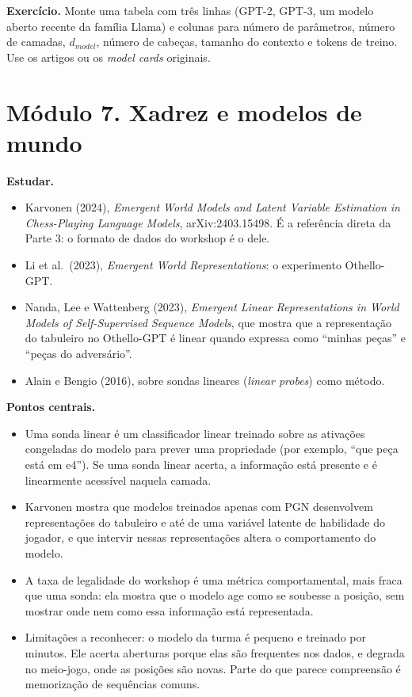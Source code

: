 \documentclass[
  11pt,
]{article}
\providecommand{\tightlist}{%
  \setlength{\itemsep}{0pt}\setlength{\parskip}{0pt}}
\begin{document}
\textbf{Exercício.} Monte uma tabela com três linhas (GPT-2, GPT-3, um
modelo aberto recente da família Llama) e colunas para número de
parâmetros, número de camadas, \(d_{model}\), número de cabeças, tamanho
do contexto e tokens de treino. Use os artigos ou os \emph{model cards}
originais.

\section{Módulo 7. Xadrez e modelos de
mundo}\label{muxf3dulo-7.-xadrez-e-modelos-de-mundo}

\textbf{Estudar.}

\begin{itemize}
\tightlist
\item
  Karvonen (2024), \emph{Emergent World Models and Latent Variable
  Estimation in Chess-Playing Language Models}, arXiv:2403.15498. É a
  referência direta da Parte 3: o formato de dados do workshop é o dele.
\item
  Li et al.~(2023), \emph{Emergent World Representations}: o experimento
  Othello-GPT.
\item
  Nanda, Lee e Wattenberg (2023), \emph{Emergent Linear Representations
  in World Models of Self-Supervised Sequence Models}, que mostra que a
  representação do tabuleiro no Othello-GPT é linear quando expressa
  como ``minhas peças'' e ``peças do adversário''.
\item
  Alain e Bengio (2016), sobre sondas lineares (\emph{linear probes})
  como método.
\end{itemize}

\textbf{Pontos centrais.}

\begin{itemize}
\tightlist
\item
  Uma sonda linear é um classificador linear treinado sobre as ativações
  congeladas do modelo para prever uma propriedade (por exemplo, ``que
  peça está em e4''). Se uma sonda linear acerta, a informação está
  presente e é linearmente acessível naquela camada.
\item
  Karvonen mostra que modelos treinados apenas com PGN desenvolvem
  representações do tabuleiro e até de uma variável latente de
  habilidade do jogador, e que intervir nessas representações altera o
  comportamento do modelo.
\item
  A taxa de legalidade do workshop é uma métrica comportamental, mais
  fraca que uma sonda: ela mostra que o modelo age como se soubesse a
  posição, sem mostrar onde nem como essa informação está representada.
\item
  Limitações a reconhecer: o modelo da turma é pequeno e treinado por
  minutos. Ele acerta aberturas porque elas são frequentes nos dados, e
  degrada no meio-jogo, onde as posições são novas. Parte do que parece
  compreensão é memorização de sequências comuns.
\end{itemize}
\end{document}
